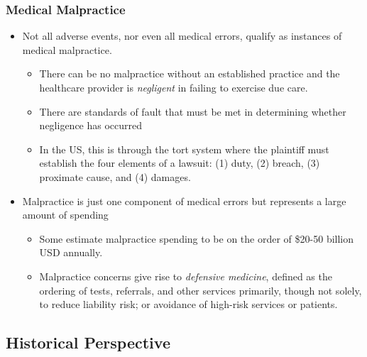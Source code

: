 \documentclass[serif,10pt]{beamer}
\begin{document}
\begin{frame}%
\frametitle{Medical Malpractice}
  \begin{itemize}
\item Not all adverse events, nor even all medical errors, qualify as instances of medical malpractice.
\begin{itemize}\item There can be no malpractice without an established practice and the healthcare provider is \textit{negligent} in failing to exercise due care.
\item There are standards of fault that must be met in determining whether negligence has occurred
\item In the US, this is through the tort system where the plaintiff must establish the four elements of a lawsuit: (1) duty, (2) breach, (3) proximate cause, and (4) damages.
\end{itemize}
\item Malpractice is just one component of medical errors but represents a large amount of spending
\begin{itemize}\item   Some estimate malpractice spending to be on the order of \$20-50 billion USD annually.
\item Malpractice concerns give rise to \textit{defensive medicine}, defined as the ordering of tests, referrals, and other services primarily, though not solely, to reduce liability risk; or avoidance of high-risk services or patients.
\end{itemize}
\end{itemize}
\end{frame}

\subsection{Historical Perspective}
\end{document}
